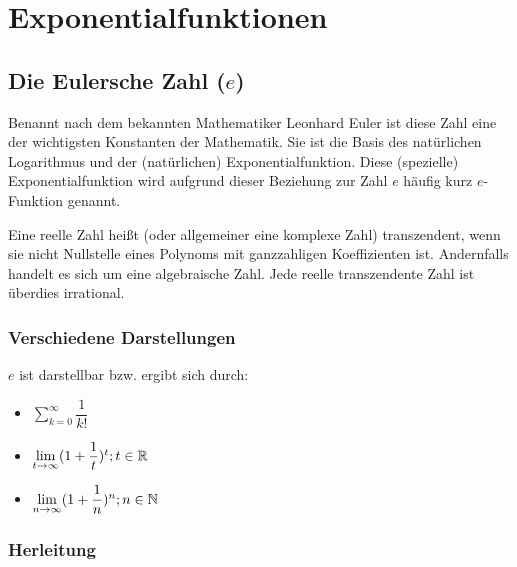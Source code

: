 \chapter{Exponentialfunktionen}

		\section{Die Eulersche Zahl ($e$)}

Benannt nach dem bekannten Mathematiker Leonhard Euler ist diese Zahl eine der wichtigsten Konstanten der Mathematik.
Sie ist die Basis des natürlichen Logarithmus und der (natürlichen) Exponentialfunktion. Diese (spezielle) Exponentialfunktion wird aufgrund dieser Beziehung zur Zahl $e$ häufig kurz $e$-Funktion genannt.
\begin{Definition}
  Eine reelle Zahl heißt (oder allgemeiner eine komplexe Zahl) transzendent,
  wenn sie nicht Nullstelle eines Polynoms mit ganzzahligen Koeffizienten ist.
  Andernfalls handelt es sich um eine algebraische Zahl. Jede reelle transzendente Zahl ist überdies irrational.
\end{Definition}

	\subsection{Verschiedene Darstellungen}

$e$ ist darstellbar bzw. ergibt sich durch:
\begin{itemize}
\item $\sum\limits_{k=0}^{\infty}$
\item $\lim\limits_{t\to \infty}(1+)^t;t\in\R$
\item $\lim\limits_{n\to \infty}(1+)^n;n\in\N$
\end{itemize}

	\subsection{Herleitung}

